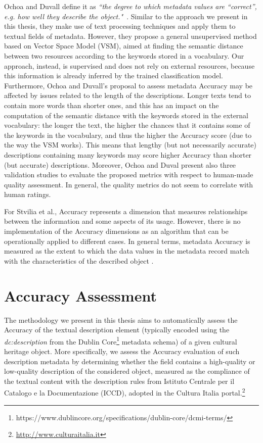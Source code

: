 \documentclass[epsfig,a4paper,12pt,titlepage]{book}
\begin{document}
Ochoa and Duvall define it as \textit{``the degree to which metadata values are ``correct'', e.g. how well they describe the object."}~\cite{2}. Similar to the approach we present in this thesis, they make use of text processing techniques and apply them to textual fields of metadata. 
However, they propose a general unsupervised method based on Vector Space Model (VSM), aimed at finding the semantic distance between two resources according to the keywords stored in a vocabulary. Our approach, instead, is supervised and does not rely on external resources, because this information is already inferred by the trained classification model. Furthermore, Ochoa and Duvall's proposal to assess metadata Accuracy may be affected by issues related to the length of the descriptions. Longer texts tend to  contain more words than shorter ones, and this has an impact on the computation of the semantic distance with the keywords stored in the external vocabulary: the longer the text, the higher the chances that it contains some of the keywords in the vocabulary, and thus the higher the Accuracy score (due to the way the VSM works). This means that lengthy (but not necessarily accurate) descriptions containing many keywords may score higher Accuracy than shorter (but accurate) descriptions.
Moreover, Ochoa and Duval present also three validation studies to evaluate the proposed metrics with respect to human-made quality assessment. In general, the quality metrics do not seem to correlate with human ratings.

For Stvilia et al., Accuracy represents a dimension that measures relationships between the information and some aspects of its usage.  However, there is no implementation of the Accuracy dimensions as an algorithm that can be operationally applied to different cases.
In general terms, metadata Accuracy is measured as the extent to which the data values in the metadata record match with the characteristics of the described object \cite{20}.


\section{Accuracy Assessment}
\label{accuassess}
The methodology we present in this thesis aims to automatically assess the Accuracy of the textual description element (typically encoded
using the  \textit{dc:description} from the Dublin Core\footnote{https://www.dublincore.org/specifications/dublin-core/dcmi-terms/} metadata schema) of a given cultural heritage object. More specifically, we assess the Accuracy evaluation of such description metadata by determining whether the field contains a high-quality or low-quality description of the considered object, measured as the compliance of the textual content with the description rules from  Istituto Centrale per il Catalogo e la Documentazione (ICCD), adopted in the Cultura Italia portal.\footnote{\url{http://www.culturaitalia.it}}
\end{document}
